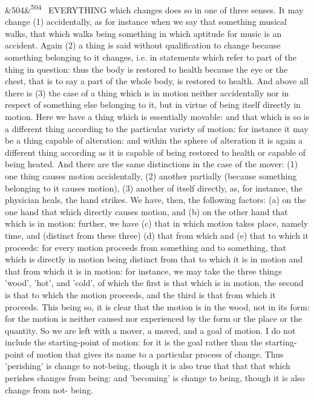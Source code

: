 \documentclass[12pt]{article}
\newcommand{\para}[1][]{\par\noindent\ifx&#1&\else\textsuperscript{\footnotesize #1}~\fi}
\begin{document}
\para[504] EVERYTHING which changes does so in one of three senses. It may change (1) accidentally, as for instance when we say that something musical walks, that which walks being something in which aptitude for music is an accident. Again (2) a thing is said without qualification to change because something belonging to it changes, i.e. in statements which refer to part of the thing in question: thus the body is restored to health because the eye or the chest, that is to say a part of the whole body, is restored to health. And above all there is (3) the case of a thing which is in motion neither accidentally nor in respect of something else belonging to it, but in virtue of being itself directly in motion. Here we have a thing which is essentially movable: and that which is so is a different thing according to the particular variety of motion: for instance it may be a thing capable of alteration: and within the sphere of alteration it is again a different thing according as it is capable of being restored to health or capable of being heated. And there are the same distinctions in the case of the mover: (1) one thing causes motion accidentally, (2) another partially (because something belonging to it causes motion), (3) another of itself directly, as, for instance, the physician heals, the hand strikes. We have, then, the following factors: (a) on the one hand that which directly causes motion, and (b) on the other hand that which is in motion: further, we have (c) that in which motion takes place, namely time, and (distinct from these three) (d) that from which and (e) that to which it proceeds: for every motion proceeds from something and to something, that which is directly in motion being distinct from that to which it is in motion and that from which it is in motion: for instance, we may take the three things 'wood', 'hot', and 'cold', of which the first is that which is in motion, the second is that to which the motion proceeds, and the third is that from which it proceeds. This being so, it is clear that the motion is in the wood, not in its form: for the motion is neither caused nor experienced by the form or the place or the quantity. So we are left with a mover, a moved, and a goal of motion. I do not include the starting-point of motion: for it is the goal rather than the starting-point of motion that gives its name to a particular process of change. Thus 'perishing' is change to not-being, though it is also true that that that which perishes changes from being: and 'becoming' is change to being, though it is also change from not- being.
\end{document}
